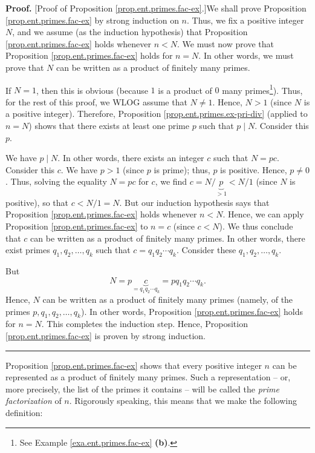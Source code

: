 \documentclass[numbers=enddot,12pt,final,onecolumn,notitlepage]{scrartcl}%
\numberwithin{exer}{subsection}
\theoremstyle{definition}
\newenvironment{proof}[1][Proof]{\noindent\textbf{#1.} }{\ \rule{0.5em}{0.5em}}
\begin{document}
\begin{proof}
[Proof of Proposition \ref{prop.ent.primes.fac-ex}.]We shall prove Proposition
\ref{prop.ent.primes.fac-ex} by strong induction on $n$. Thus, we fix a
positive integer $N$, and we assume (as the induction hypothesis) that
Proposition \ref{prop.ent.primes.fac-ex} holds whenever $n<N$. We must now
prove that Proposition \ref{prop.ent.primes.fac-ex} holds for $n=N$. In other
words, we must prove that $N$ can be written as a product of finitely many primes.

If $N=1$, then this is obvious (because $1$ is a product of $0$ many
primes\footnote{See Example \ref{exa.ent.primes.fac-ex} \textbf{(b)}.}). Thus,
for the rest of this proof, we WLOG assume that $N\neq1$. Hence, $N>1$ (since
$N$ is a positive integer). Therefore, Proposition
\ref{prop.ent.primes.ex-pri-div} (applied to $n=N$) shows that there exists at
least one prime $p$ such that $p\mid N$. Consider this $p$.

We have $p\mid N$. In other words, there exists an integer $c$ such that
$N=pc$. Consider this $c$. We have $p>1$ (since $p$ is prime); thus, $p$ is
positive. Hence, $p\neq0$. Thus, solving the equality $N=pc$ for $c$, we find
$c=N/\underbrace{p}_{>1}<N/1$ (since $N$ is positive), so that $c<N/1=N$. But
our induction hypothesis says that Proposition \ref{prop.ent.primes.fac-ex}
holds whenever $n<N$. Hence, we can apply Proposition
\ref{prop.ent.primes.fac-ex} to $n=c$ (since $c<N$). We thus conclude that $c$
can be written as a product of finitely many primes. In other words, there
exist primes $q_{1},q_{2},\ldots,q_{k}$ such that $c=q_{1}q_{2}\cdots q_{k}$.
Consider these $q_{1},q_{2},\ldots,q_{k}$.

But%
\[
N=p\underbrace{c}_{=q_{1}q_{2}\cdots q_{k}}=pq_{1}q_{2}\cdots q_{k}.
\]
Hence, $N$ can be written as a product of finitely many primes (namely, of the
primes $p,q_{1},q_{2},\ldots,q_{k}$). In other words, Proposition
\ref{prop.ent.primes.fac-ex} holds for $n=N$. This completes the induction
step. Hence, Proposition \ref{prop.ent.primes.fac-ex} is proven by strong induction.
\end{proof}

Proposition \ref{prop.ent.primes.fac-ex} shows that every positive integer $n$
can be represented as a product of finitely many primes. Such a representation
-- or, more precisely, the list of the primes it contains -- will be called
the \textit{prime factorization} of $n$. Rigorously speaking, this means that
we make the following definition:
\end{document}
